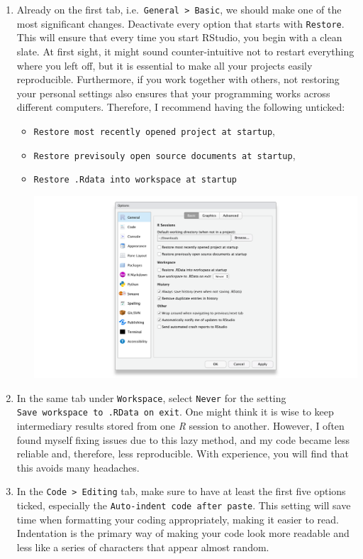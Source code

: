 \documentclass[
  letterpaper,
]{krantz}
\begin{document}
\begin{enumerate}
\def\labelenumi{\arabic{enumi}.}
\item
  Already on the first tab,
  i.e.~\texttt{General\ \textgreater{}\ Basic}, we should make one of
  the most significant changes. Deactivate every option that starts with
  \texttt{Restore}. This will ensure that every time you start RStudio,
  you begin with a clean slate. At first sight, it might sound
  counter-intuitive not to restart everything where you left off, but it
  is essential to make all your projects easily reproducible.
  Furthermore, if you work together with others, not restoring your
  personal settings also ensures that your programming works across
  different computers. Therefore, I recommend having the following
  unticked:

  \begin{itemize}
  \item
    \texttt{Restore\ most\ recently\ opened\ project\ at\ startup},
  \item
    \texttt{Restore\ previsouly\ open\ source\ documents\ at\ startup},
  \item
    \texttt{Restore\ .Rdata\ into\ workspace\ at\ startup}

    \includegraphics{images/chapter_03_img/rstudio_preferences/00_rstudio_preferences_basic.png}
  \end{itemize}
\item
  In the same tab under \texttt{Workspace}, select \texttt{Never} for
  the setting \texttt{Save\ workspace\ to\ .RData\ on\ exit}. One might
  think it is wise to keep intermediary results stored from one \emph{R}
  session to another. However, I often found myself fixing issues due to
  this lazy method, and my code became less reliable and, therefore,
  less reproducible. With experience, you will find that this avoids
  many headaches.
\item
  In the \texttt{Code\ \textgreater{}\ Editing} tab, make sure to have
  at least the first five options ticked, especially the
  \texttt{Auto-indent\ code\ after\ paste}. This setting will save time
  when formatting your coding appropriately, making it easier to read.
  Indentation is the primary way of making your code look more readable
  and less like a series of characters that appear almost random.


\end{enumerate}
\end{document}
